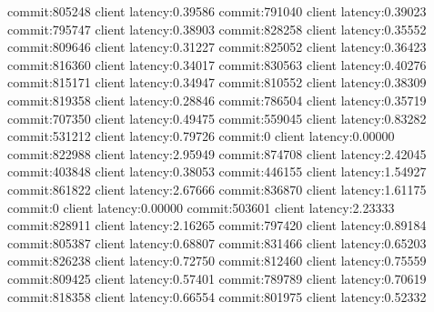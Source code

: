commit:805248 client latency:0.39586
commit:791040 client latency:0.39023
commit:795747 client latency:0.38903
commit:828258 client latency:0.35552
commit:809646 client latency:0.31227
commit:825052 client latency:0.36423
commit:816360 client latency:0.34017
commit:830563 client latency:0.40276
commit:815171 client latency:0.34947
commit:810552 client latency:0.38309
commit:819358 client latency:0.28846
commit:786504 client latency:0.35719
commit:707350 client latency:0.49475
commit:559045 client latency:0.83282
commit:531212 client latency:0.79726
commit:0 client latency:0.00000
commit:822988 client latency:2.95949
commit:874708 client latency:2.42045
commit:403848 client latency:0.38053
commit:446155 client latency:1.54927
commit:861822 client latency:2.67666
commit:836870 client latency:1.61175
commit:0 client latency:0.00000
commit:503601 client latency:2.23333
commit:828911 client latency:2.16265
commit:797420 client latency:0.89184
commit:805387 client latency:0.68807
commit:831466 client latency:0.65203
commit:826238 client latency:0.72750
commit:812460 client latency:0.75559
commit:809425 client latency:0.57401
commit:789789 client latency:0.70619
commit:818358 client latency:0.66554
commit:801975 client latency:0.52332